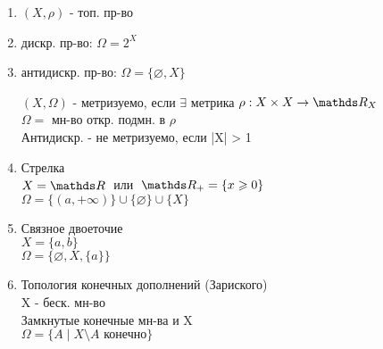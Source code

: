 \documentclass[geometry.tex]{subfiles}
\begin{document}
  \begin{examples}
      \begin{enumerate}
          \item $(X, \rho)$ - топ. пр-во
          \item дискр. пр-во: $\Omega = 2^X$
          \item антидискр. пр-во: $\Omega = \{\varnothing, X\}$

      \begin{definition}
          $(X, \Omega)$ - метризуемо, если $\exists$ метрика $\rho: X \times X \rightarrow \R_X$\\
          $\Omega = $ мн-во откр. подмн. в $\rho$\\
          Антидискр. - не метризуемо, если |X| > 1
      \end{definition}
          \item Стрелка\\
                $X = \R  \;$ или $\;  \R_+ = \{x \geq 0\}$\\
                $\Omega = \{(a, +\infty)\} \cup \{\varnothing\} \cup \{X\}$
          \item Связное двоеточие\\
                $X = \{a, b\}$\\
                $\Omega = \{\varnothing, X, \{a\}\}$
          \item Топология конечных дополнений (Зариского)\\
                X - беск. мн-во\\
                Замкнутые конечные мн-ва и X \\
                $\Omega = \{A \; | \; X \setminus A \text{ конечно}\}$
      \end{enumerate}
  \end{examples}
\end{document}
